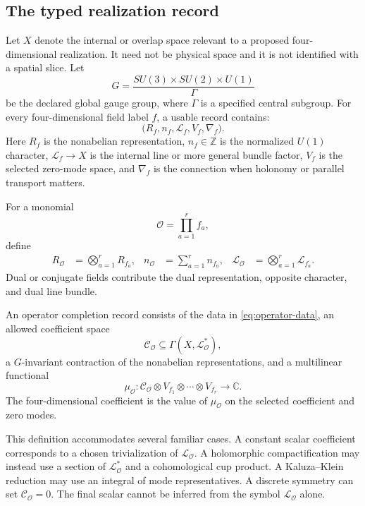 \documentclass[11pt]{article}
\newcommand{\Z}{\mathbb{Z}}
\newcommand{\C}{\mathbb{C}}
\newcommand{\Line}{\mathcal{L}}
\newcommand{\Coeff}{\mathcal{C}}
\newcommand{\Ops}{\mathcal{O}}
\begin{document}
\subsection{The typed realization record}

Let \(X\) denote the internal or overlap space relevant to a proposed
four-dimensional realization. It need not be physical space and it is not
identified with a spatial slice. Let
\[
G=\frac{SU(3)\times SU(2)\times U(1)}{\Gamma}
\]
be the declared global gauge group, where \(\Gamma\) is a specified central
subgroup. For every four-dimensional field label \(f\), a usable record
contains:
\[
\bigl(R_f,n_f,\Line_f,V_f,\nabla_f\bigr).
\]
Here \(R_f\) is the nonabelian representation, \(n_f\in\Z\) is the normalized
\(U(1)\) character, \(\Line_f\to X\) is the internal line or more general
bundle factor, \(V_f\) is the selected zero-mode space, and \(\nabla_f\) is
the connection when holonomy or parallel transport matters.

For a monomial
\[
\Ops=\prod_{a=1}^{r} f_a,
\]
define
\begin{align}
R_{\Ops}&=\bigotimes_{a=1}^{r}R_{f_a},&
n_{\Ops}&=\sum_{a=1}^{r}n_{f_a},&
\Line_{\Ops}&=\bigotimes_{a=1}^{r}\Line_{f_a}.
\label{eq:operator-data}
\end{align}
Dual or conjugate fields contribute the dual representation, opposite
character, and dual line bundle.

\begin{definition}\label{def:completion}
An operator completion record consists of the data in
\eqref{eq:operator-data}, an allowed coefficient space
\[
\Coeff_{\Ops}\subseteq
\Gamma\!\left(X,\Line_{\Ops}^{*}\right),
\]
a \(G\)-invariant contraction of the nonabelian representations, and a
multilinear functional
\[
\mu_{\Ops}:
\Coeff_{\Ops}\otimes V_{f_1}\otimes\cdots\otimes V_{f_r}
\longrightarrow \C.
\]
The four-dimensional coefficient is the value of \(\mu_{\Ops}\) on the
selected coefficient and zero modes.
\end{definition}

This definition accommodates several familiar cases. A constant scalar
coefficient corresponds to a chosen trivialization of
\(\Line_{\Ops}\). A holomorphic compactification may instead use a section of
\(\Line_{\Ops}^{*}\) and a cohomological cup product. A Kaluza--Klein
reduction may use an integral of mode representatives. A discrete symmetry
can set \(\Coeff_{\Ops}=0\). The final scalar cannot be inferred from the
symbol \(\Line_{\Ops}\) alone.
\end{document}
